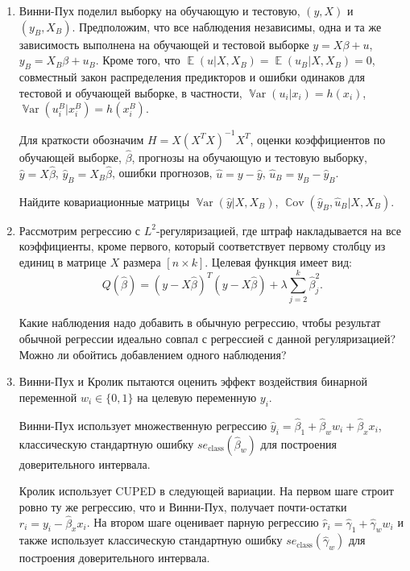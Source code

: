 \documentclass[12pt]{article}
\DeclareMathOperator{\Cov}{\mathbb{C}ov}
\DeclareMathOperator{\Var}{\mathbb{V}ar}
\DeclareMathOperator{\E}{\mathbb{E}}
\begin{document}
\begin{enumerate}

\item Винни-Пух поделил выборку на обучающую и тестовую, $(y, X)$ и $(y_B, X_B)$. 
Предположим, что все наблюдения независимы, одна и та же зависимость выполнена
на обучающей и тестовой выборке $y=X\beta + u$, $y_B = X_B\beta + u_B$.
Кроме того, что $\E(u|X, X_B) = \E(u_B|X, X_B) = 0$, совместный закон распределения предикторов и ошибки 
одинаков для тестовой и обучающей выборке, в частности, $\Var(u_i | x_i) = h(x_i)$, 
$\Var(u_i^B | x_i^B) = h(x_i^B)$.

Для краткости обозначим $H = X(X^TX)^{-1}X^T$, оценки коэффициентов по обучающей выборке, $\hat\beta$, 
прогнозы на обучающую и тестовую выборку, $\hat y = X\hat \beta$, $\hat y_B = X_B\hat \beta$,
ошибки прогнозов, $\hat u = y - \hat y$, $\hat u_B = y_B - \hat y_B$.

Найдите ковариационные матрицы $\Var(\hat y |X, X_B)$, $\Cov(\hat y_B, \hat u_B | X, X_B)$.



\item Рассмотрим регрессию с $L^2$-регуляризацией, где штраф накладывается на все коэффициенты,
кроме первого, который соответствует первому столбцу из единиц в матрице $X$ размера $[n\times k]$. 
Целевая функция имеет вид:
\[
Q(\hat \beta) = (y - X\hat\beta)^T (y - X\hat\beta) + \lambda \sum_{j=2}^k \hat\beta_j^2. 
\]

Какие наблюдения надо добавить в обычную регрессию, чтобы результат обычной регрессии 
идеально совпал с регрессией с данной регуляризацией? Можно ли обойтись добавлением одного наблюдения?

\item Винни-Пух и Кролик пытаются оценить эффект воздействия бинарной переменной $w_i \in \{0, 1\}$
на целевую переменную $y_i$.

Винни-Пух использует множественную регрессию $\hat y_i = \hat\beta_1 + \hat\beta_w w_i + \hat \beta_x x_i$,
классическую стандартную ошибку $se_{\text{class}}(\hat\beta_w)$ для построения доверительного интервала. 

Кролик использует CUPED в следующей вариации. На первом шаге строит ровно ту же регрессию, что и Винни-Пух,
получает почти-остатки $r_i =y_i - \hat\beta_x x_i$. На втором шаге оценивает парную регрессию 
$\hat r_i = \hat\gamma_1 +\hat\gamma_w w_i$ и также использует 
классическую стандартную ошибку $se_{\text{class}}(\hat\gamma_w)$ для построения доверительного интервала. 


\end{enumerate}
\end{document}
